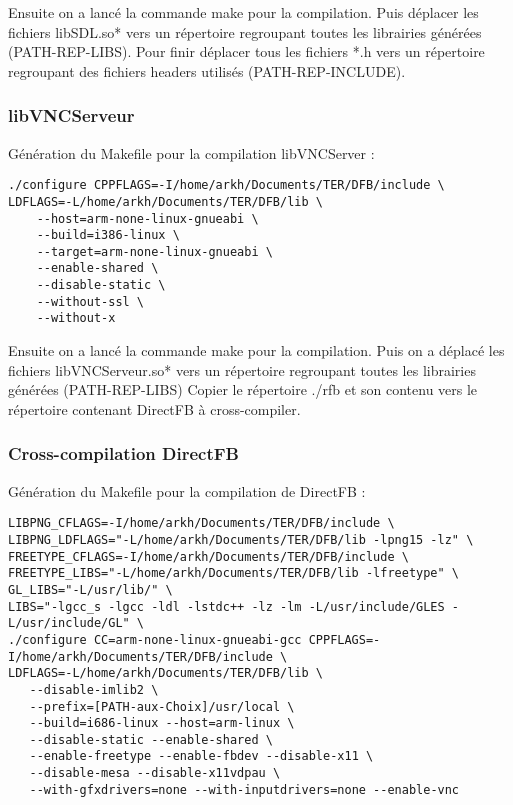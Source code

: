 Ensuite on a lancé la commande make pour la compilation.
Puis déplacer les fichiers libSDL.so* vers un répertoire regroupant toutes les librairies générées (PATH-REP-LIBS).
Pour finir déplacer tous les fichiers *.h vers un répertoire regroupant des fichiers headers utilisés (PATH-REP-INCLUDE).

\subsubsection{libVNCServeur}

Génération du Makefile pour la compilation libVNCServer :

\begin{lstlisting}
./configure CPPFLAGS=-I/home/arkh/Documents/TER/DFB/include \
LDFLAGS=-L/home/arkh/Documents/TER/DFB/lib \  
	--host=arm-none-linux-gnueabi \
	--build=i386-linux \
	--target=arm-none-linux-gnueabi \ 
	--enable-shared \
	--disable-static \
	--without-ssl \
	--without-x
\end{lstlisting}

Ensuite on a lancé la commande make pour la compilation.
Puis on a déplacé les fichiers libVNCServeur.so* vers un répertoire regroupant toutes les librairies générées (PATH-REP-LIBS)
Copier le répertoire ./rfb et son contenu vers le répertoire contenant DirectFB à cross-compiler.

\subsubsection{Cross-compilation DirectFB}

Génération du Makefile pour la compilation de DirectFB :

\begin{lstlisting}
LIBPNG_CFLAGS=-I/home/arkh/Documents/TER/DFB/include \
LIBPNG_LDFLAGS="-L/home/arkh/Documents/TER/DFB/lib -lpng15 -lz" \
FREETYPE_CFLAGS=-I/home/arkh/Documents/TER/DFB/include \
FREETYPE_LIBS="-L/home/arkh/Documents/TER/DFB/lib -lfreetype" \
GL_LIBS="-L/usr/lib/" \
LIBS="-lgcc_s -lgcc -ldl -lstdc++ -lz -lm -L/usr/include/GLES -L/usr/include/GL" \
./configure CC=arm-none-linux-gnueabi-gcc CPPFLAGS=-I/home/arkh/Documents/TER/DFB/include \
LDFLAGS=-L/home/arkh/Documents/TER/DFB/lib \
   --disable-imlib2 \
   --prefix=[PATH-aux-Choix]/usr/local \
   --build=i686-linux --host=arm-linux \
   --disable-static --enable-shared \
   --enable-freetype --enable-fbdev --disable-x11 \
   --disable-mesa --disable-x11vdpau \
   --with-gfxdrivers=none --with-inputdrivers=none --enable-vnc
\end{lstlisting}

